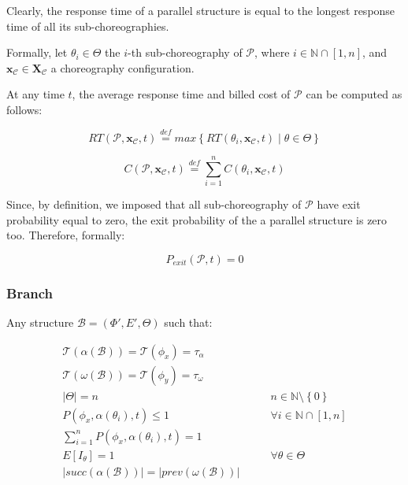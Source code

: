 \documentclass[12pt,a4paper]{report}
\newcommand{\mathDef}{\overset{\textit{def}}{=}}
\newcommand{\N}{\mathbb{N}}
\newcommand{\SetFromOneTo}[1]{\N \cap \left[1,#1\right]}
\begin{document}
Clearly, the response time of a parallel structure is equal to the longest response time of all its sub-choreographies.

Formally, let $\theta_i \in \Theta$ the $i$-th sub-choreography of $\mathcal{P}$, where $i \in \N \cap \left[1,n\right]$, and $\textbf{x}_{\mathcal{C}} \in \textbf{X}_{\mathcal{C}}$ a choreography configuration.

At any time $t$, the average response time and billed cost of $\mathcal{P}$ can be computed as follows:

\begin{equation}
	RT(\mathcal{P},\textbf{x}_{\mathcal{C}}, t) \mathDef max \left\lbrace RT(\theta_i,\textbf{x}_{\mathcal{C}}, t) \mid \theta \in \Theta \right\rbrace 
\end{equation}

\begin{equation}
	C(\mathcal{P},\textbf{x}_{\mathcal{C}}, t) \mathDef \sum_{i = 1}^n C(\theta_i,\textbf{x}_{\mathcal{C}}, t)
\end{equation}

Since, by definition, we imposed that all sub-choreography of $\mathcal{P}$ have exit probability equal to zero, the exit probability of the a parallel structure is zero too. Therefore, formally:

\begin{equation}
	P_{exit}(\mathcal{P}, t) = 0
\end{equation}

\subsubsection{Branch}

Any structure $\mathcal{B} = (\Phi',E',\Theta)$ such that:

\begin{eqnarray}
	\mathscr{T}(\alpha(\mathcal{B})) = \mathscr{T}(\phi_x) = \tau_{\alpha} \\ \mathscr{T}(\omega(\mathcal{B})) = \mathscr{T}(\phi_y) = \tau_{\omega} \\
	|\Theta| = n  & \qquad n \in \N \setminus \left\{0\right\} \\
	P(\phi_x, \alpha(\theta_i),t) \leq 1 & \qquad \forall i \in \SetFromOneTo{n} \\
	\sum_{i = 1}^n P(\phi_x, \alpha(\theta_i),t) = 1 & \\
	E[I_{\theta}] = 1 & \qquad \forall \theta \in \Theta \\
	|succ(\alpha(\mathcal{B}))| = |prev(\omega(\mathcal{B}))|
\end{eqnarray}
\end{document}
